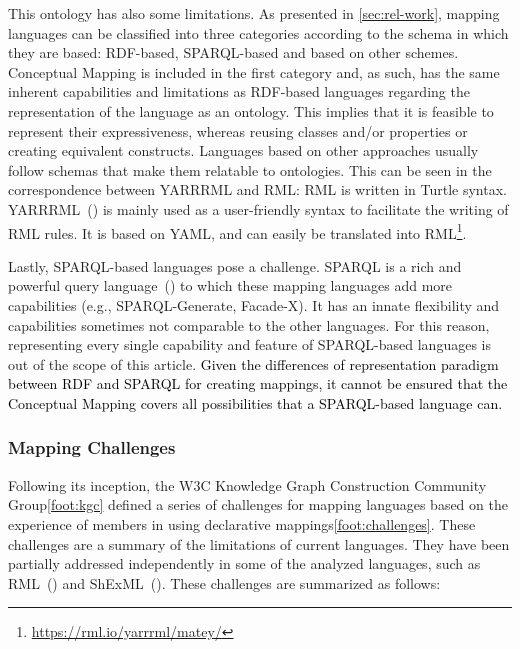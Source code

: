 This ontology has also some limitations. As presented in \cref{sec:rel-work}, mapping languages can be classified into three categories according to the schema in which they are based: RDF-based, SPARQL-based and based on other schemes. Conceptual Mapping is included in the first category and, as such, has the same inherent capabilities and limitations as RDF-based languages regarding the representation of the language as an ontology. This implies that it is feasible to represent their expressiveness, whereas reusing classes and/or properties or creating equivalent constructs. Languages based on other approaches usually follow schemas that make them relatable to ontologies. This can be seen in the correspondence between YARRRML and RML: RML is written in Turtle syntax. YARRRML~(\cite{Heyvaert2018yarrrml}) is mainly used as a user-friendly syntax to facilitate the writing of RML rules. It is based on YAML, and can easily be translated into RML\footnote{\url{https://rml.io/yarrrml/matey/}}. 

Lastly, SPARQL-based languages pose a challenge. SPARQL is a rich and powerful query language~(\cite{perez2009semantics}) to which these mapping languages add more capabilities (e.g., SPARQL-Generate, Facade-X). It has an innate flexibility and capabilities sometimes not comparable to the other languages. For this reason, representing every single capability and feature of SPARQL-based languages is out of the scope of this article. \textcolor{black}{Given the differences of representation paradigm between RDF and SPARQL for creating mappings, it cannot be ensured that the Conceptual Mapping covers all possibilities that a SPARQL-based language can.}


\subsubsection{Mapping Challenges}

Following its inception, the W3C Knowledge Graph Construction Community Group\cref{foot:kgc} defined a series of challenges for mapping languages based on the experience of members in using declarative mappings\cref{foot:challenges}. These challenges are a summary of the limitations of current languages. They have been partially addressed independently in some of the analyzed languages, such as RML~(\cite{delva2021rml-fields}) and ShExML~(\cite{garcia2021shexml-challenges}). These challenges are summarized as follows:

